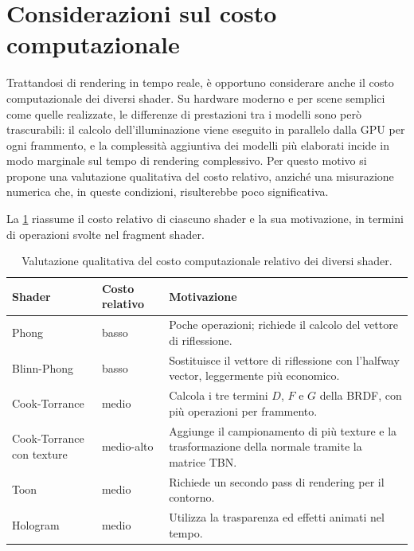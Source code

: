\documentclass[12pt,a4paper,twoside]{book}
\begin{document}
\newpage

\section{Considerazioni sul costo computazionale}
\label{sec:costo}

Trattandosi di rendering in tempo reale, è opportuno considerare anche il costo computazionale dei diversi shader. Su hardware moderno e per scene semplici come quelle realizzate, le differenze di prestazioni tra i modelli sono però trascurabili: il calcolo dell'illuminazione viene eseguito in parallelo dalla GPU per ogni frammento, e la complessità aggiuntiva dei modelli più elaborati incide in modo marginale sul tempo di rendering complessivo. Per questo motivo si propone una valutazione qualitativa del costo relativo, anziché una misurazione numerica che, in queste condizioni, risulterebbe poco significativa.

La \cref{tab:costo} riassume il costo relativo di ciascuno shader e la sua motivazione, in termini di operazioni svolte nel fragment shader.

\begin{table}[H]
    \centering
    \small
    \begin{tabular}{p{3cm} p{2.2cm} p{7cm}}
        \hline
        \textbf{Shader} & \textbf{Costo relativo} & \textbf{Motivazione}\\
        \hline
        Phong & basso & Poche operazioni; richiede il calcolo del vettore di riflessione. \\
        \hline
        Blinn-Phong & basso & Sostituisce il vettore di riflessione con l'halfway vector, leggermente più economico. \\
        \hline
        Cook-Torrance & medio & Calcola i tre termini $D$, $F$ e $G$ della BRDF, con più operazioni per frammento. \\
        \hline
        Cook-Torrance con texture & medio-alto & Aggiunge il campionamento di più texture e la trasformazione della normale tramite la matrice TBN. \\
        \hline
        Toon & medio & Richiede un secondo pass di rendering per il contorno. \\
        \hline
        Hologram & medio & Utilizza la trasparenza ed effetti animati nel tempo. \\
        \hline
    \end{tabular}
    \caption[Costo computazionale degli shader]{Valutazione qualitativa del costo computazionale relativo dei diversi shader.}
    \label{tab:costo}
\end{table}
\end{document}
